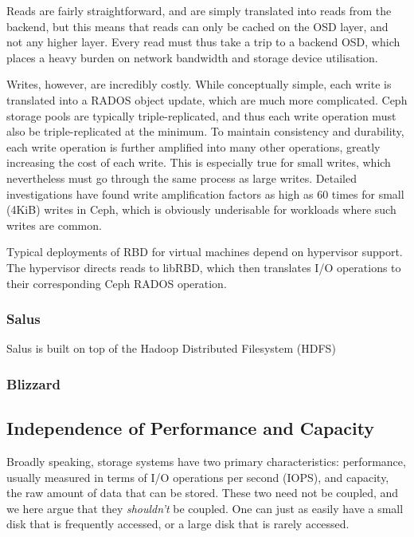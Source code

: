 Reads are fairly straightforward, and are simply translated into reads from the
backend, but this means that reads can only be cached on the OSD layer, and
not any higher layer. Every read must thus take a trip to a backend OSD, which
places a heavy burden on network bandwidth and storage device utilisation.

Writes, however, are incredibly costly. While conceptually simple, each write is
translated into a RADOS object update, which are much more complicated.  Ceph
storage pools are typically triple-replicated, and thus each write operation
must also be triple-replicated at the minimum. To maintain consistency and
durability, each write operation is further amplified into many other
operations, greatly increasing the cost of each write. This is especially true
for small writes, which nevertheless must go through the same process as large
writes. Detailed investigations\cite{lee2017understanding,aghayev2019file} have
found write amplification factors as high as 60 times for small (4KiB) writes in
Ceph, which is obviously underisable for workloads where such writes are common.

Typical deployments of RBD for virtual machines depend on hypervisor support.
The hypervisor directs reads to libRBD, which then translates I/O operations to
their corresponding Ceph RADOS operation.

\subsubsection{Salus}

Salus is built on top of the Hadoop Distributed Filesystem (HDFS) 

\subsubsection{Blizzard}


\subsection{Independence of Performance and Capacity}

Broadly speaking, storage systems have two primary characteristics: performance,
usually measured in terms of I/O operations per second (IOPS), and capacity,
the raw amount of data that can be stored. These two need not be coupled, and
we here argue that they \textit{shouldn't} be coupled. One can just as easily
have a small disk that is frequently accessed, or a large disk that is rarely
accessed.

